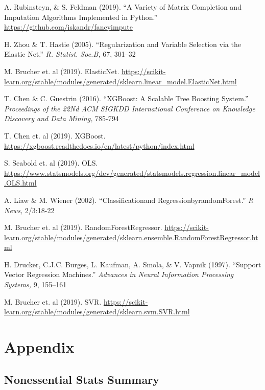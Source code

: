 \documentclass[12pt]{article}
\begin{document}
\pagebreak
\begin{thebibliography}{}

A. Rubinsteyn, \& S. Feldman (2019). 
``A Variety of Matrix Completion and Imputation Algorithms Implemented in Python.'' 
\url{https://github.com/iskandr/fancyimpute}

H. Zhou \& T. Hastie (2005). 
``Regularization and Variable Selection via the Elastic Net.'' 
\textit{R. Statist. Soc.B,} 67, 301–32

M. Brucher et. al (2019). 
ElasticNet. \url{https://scikit-learn.org/stable/modules/generated/sklearn.linear_model.ElasticNet.html}

T. Chen \& C. Guestrin (2016). 
``XGBoost: A Scalable Tree Boosting System.'' 
\textit{Proceedings of the 22Nd ACM SIGKDD International Conference on Knowledge Discovery and Data Mining,} 785-794

T. Chen et. al (2019). 
XGBoost. \url{https://xgboost.readthedocs.io/en/latest/python/index.html}

S. Seabold et. al (2019). 
OLS. \url{https://www.statsmodels.org/dev/generated/statsmodels.regression.linear_model.OLS.html}

A. Liaw \& M. Wiener (2002). 
``Classificationand RegressionbyrandomForest.'' 
\textit{R News,} 2/3:18-22

M. Brucher et. al (2019). 
RandomForestRegressor. \url{https://scikit-learn.org/stable/modules/generated/sklearn.ensemble.RandomForestRegressor.html}

H. Drucker, C.J.C. Burges, L. Kaufman, A. Smola, \& V. Vapnik (1997).
``Support Vector Regression Machines.'' 
\textit{Advances in Neural Information Processing Systems,} 9, 155–161

M. Brucher et. al (2019). 
SVR. \url{https://scikit-learn.org/stable/modules/generated/sklearn.svm.SVR.html}



\end{thebibliography}

\pagebreak
\section{Appendix}
\subsection{Nonessential Stats Summary}
\end{document}
